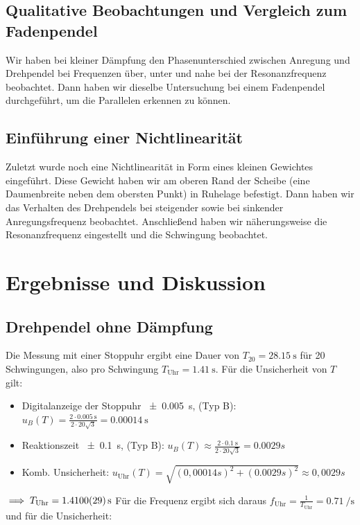 \documentclass[
	a4paper,
	12pt,
	pagesize,
	ngerman
]{scrartcl}
\begin{document}
	\subsection{Qualitative Beobachtungen und Vergleich zum Fadenpendel}
	Wir haben bei kleiner Dämpfung den Phasenunterschied zwischen Anregung und Drehpendel bei Frequenzen über, unter und nahe bei der Resonanzfrequenz beobachtet. Dann haben wir dieselbe Untersuchung bei einem Fadenpendel durchgeführt, um die Parallelen erkennen zu können.
	\subsection{Einführung einer Nichtlinearität}
	Zuletzt wurde noch eine Nichtlinearität in Form eines kleinen Gewichtes eingeführt. Diese Gewicht haben wir am oberen Rand der Scheibe (eine Daumenbreite neben dem obersten Punkt) in Ruhelage befestigt. Dann haben wir das Verhalten des Drehpendels bei steigender sowie bei sinkender Anregungsfrequenz beobachtet. Anschließend haben wir näherungsweise die Resonanzfrequenz eingestellt und die Schwingung beobachtet.
	
	\section{Ergebnisse und Diskussion}
	
	\subsection{Drehpendel ohne Dämpfung}
	Die Messung mit einer Stoppuhr ergibt eine Dauer von $T_20 =\SI{28,15}{\second}$ für 20 Schwingungen, also pro Schwingung $ T_\text{Uhr} = \SI{1,41}{\second}$. %
	Für die Unsicherheit von \(T\) gilt: \\
	\begin{itemize}
		\item  Digitalanzeige der Stoppuhr \SI{\pm 0,005}{\second}, (Typ B): \( u_B(T) = \frac{2\cdot \SI{0,005}{\second}}{2 \cdot 20 \sqrt{3}} = \SI{0,00014}{\second} \)
		\item Reaktionszeit \SI{\pm 0,1}{\second}, (Typ B): \( u_B(T) \approx \frac{2\cdot \SI{0,1}{\second}}{2 \cdot 20 \sqrt{3}} = 0.0029\si{s} \)
		\item Komb. Unsicherheit: $ u_\text{Uhr}(T) = \sqrt{(0,00014\si{s})^2+(0.0029\si{s})^2} \approx 0,0029 \si{s} $
	\end{itemize} 
	$ \implies T_\text{Uhr} = \SI{1,41 \pm 0,0029}{\second} $ \newline 
	Für die Frequenz ergibt sich daraus $ f_\text{Uhr} = \frac{1}{T_\text{Uhr}} = \SI{0,71}{\per \second}$ und für die Unsicherheit: \newline
	
\end{document}
